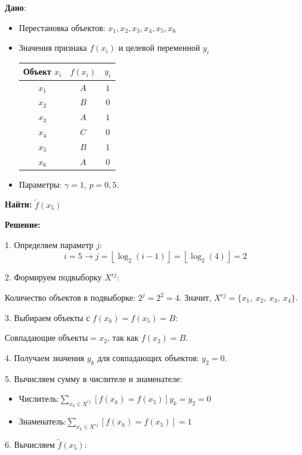 \textbf{Дано}:
\begin{itemize}
    \item Перестановка объектов: $x_1, x_2, x_3, x_4, x_5, x_6$
    \item Значения признака  $f(x_i)$ и целевой переменной $y_i$
    \begin{table}[ht]
    \centering
    \begin{tabular}{c|c|c}
    Объект \( x_i \) & \( f(x_i) \) & \( y_i \) \\
    \hline
    \( x_1 \) & \( A \) & \( 1 \) \\
    \( x_2 \) & \( B \) & \( 0 \) \\
    \( x_3 \) & \( A \) & \( 1 \) \\
    \( x_4 \) & \( C \) & \( 0 \) \\
    \( x_5 \) & \( B \) & \( 1 \) \\
    \( x_6 \) & \( A \) & \( 0 \) \\
    \end{tabular}
    \end{table}
    \item Параметры: $\gamma = 1$, $p = 0{,}5$.
\end{itemize}

\textbf{Найти:} $\tilde{f}(x_5)$


\textbf{Решение:}

1. Определяем параметр $j$: 
$$
i = 5 \rightarrow j = \left\lfloor \log_2(i - 1) \right\rfloor = \left\lfloor \log_2(4) \right\rfloor = 2
$$

2. Формируем подвыборку $X^{rj}$:

   Количество объектов в подвыборке: $2^j = 2^2 = 4$. Значит, $X^{rj} = \{ x_1, \ x_2, \ x_3, \ x_4 \}$.

3. Выбираем объекты с \( f(x_k) = f(x_5) = B \):

   $\text{Совпадающие объекты} = x_2$, так как $f(x_2) = B$.

4. Получаем значения $y_k$ для совпадающих объектов: $y_2 = 0$.

5. Вычисляем сумму в числителе и знаменателе:
\begin{itemize}
   \item $\text{Числитель:} \sum\limits_{x_k \in X^{rj}} [f(x_k) = f(x_5)] y_k = y_2 = 0$
   \item $\text{Знаменатель:} \sum\limits_{x_k \in X^{rj}} [f(x_k) = f(x_5)] = 1$ 
\end{itemize}

6. Вычисляем $\tilde{f}(x_5)$:


